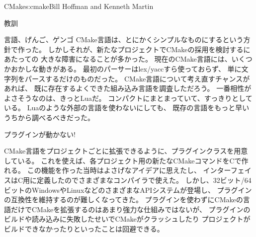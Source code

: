 \begin{aosachapter}{CMake}{s:cmake}{Bill Hoffman and Kenneth Martin}
\begin{aosasect1}{教訓}
\begin{aosasect2}{言語、げんご、ゲンゴ}
CMake言語は、とにかくシンプルなものにするという方針で作った。
しかしそれが、新たなプロジェクトでCMakeの採用を検討するにあたっての
大きな障害になることが多かった。
現在のCMake言語には、いくつかおかしな動きがある。
最初のパーサーはlex/yaccすら使っておらず、
単に文字列をパースするだけのものだった。
CMake言語について考え直すチャンスがあれば、
既に存在するよくできた組み込み言語を調査しただろう。
一番相性がよさそうなのは、きっとLuaだ。
コンパクトにまとまっていて、すっきりとしている。
Luaのような外部の言語を使わないにしても、
既存の言語をもっと早いうちから調べるべきだった。

\end{aosasect2}

\begin{aosasect2}{プラグインが動かない!}

CMake言語をプロジェクトごとに拡張できるように、プラグインクラスを用意している。
これを使えば、各プロジェクト用の新たなCMakeコマンドをCで作れる。
この機能を作った当時はよさげなアイデアに思えたし、
インターフェイスはC用に定義したのでさまざまなコンパイラで使えた。
しかし、32ビット/64ビットのWindowsやLinuxなどのさまざまなAPIシステムが登場し、
プラグインの互換性を維持するのが難しくなってきた。
プラグインを使わずにCMakeの言語だけでCMakeを拡張するのはあまり強力な仕組みではないが、
プラグインのビルドや読み込みに失敗したせいでCMakeがクラッシュしたり
プロジェクトがビルドできなかったりといったことは回避できる。


\end{aosasect2}
\end{aosasect1}
\end{aosachapter}
